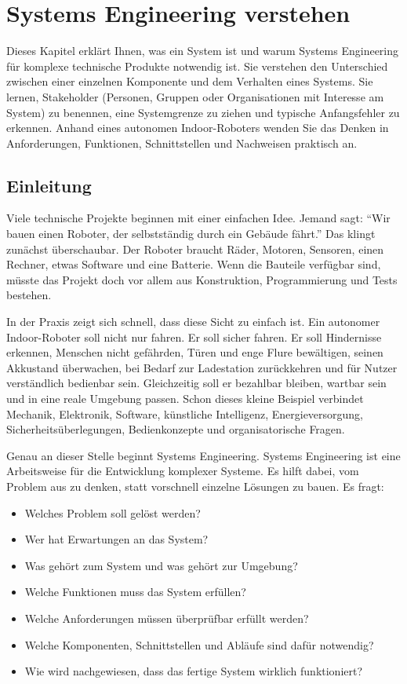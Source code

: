 \chapter{Systems Engineering verstehen}

\begin{lernziele}
Dieses Kapitel erklärt Ihnen, was ein System ist und warum Systems Engineering für komplexe technische Produkte notwendig ist. Sie verstehen den Unterschied zwischen einer einzelnen Komponente und dem Verhalten eines Systems. Sie lernen, Stakeholder (Personen, Gruppen oder Organisationen mit Interesse am System) zu benennen, eine Systemgrenze zu ziehen und typische Anfangsfehler zu erkennen. Anhand eines autonomen Indoor-Roboters wenden Sie das Denken in Anforderungen, Funktionen, Schnittstellen und Nachweisen praktisch an.
\end{lernziele}

\section{Einleitung}
Viele technische Projekte beginnen mit einer einfachen Idee. Jemand sagt: \enquote{Wir bauen einen Roboter, der selbstständig durch ein Gebäude fährt.} Das klingt zunächst überschaubar. Der Roboter braucht Räder, Motoren, Sensoren, einen Rechner, etwas Software und eine Batterie. Wenn die Bauteile verfügbar sind, müsste das Projekt doch vor allem aus Konstruktion, Programmierung und Tests bestehen.

In der Praxis zeigt sich schnell, dass diese Sicht zu einfach ist. Ein autonomer Indoor-Roboter soll nicht nur fahren. Er soll sicher fahren. Er soll Hindernisse erkennen, Menschen nicht gefährden, Türen und enge Flure bewältigen, seinen Akkustand überwachen, bei Bedarf zur Ladestation zurückkehren und für Nutzer verständlich bedienbar sein. Gleichzeitig soll er bezahlbar bleiben, wartbar sein und in eine reale Umgebung passen. Schon dieses kleine Beispiel verbindet Mechanik, Elektronik, Software, künstliche Intelligenz, Energieversorgung, Sicherheitsüberlegungen, Bedienkonzepte und organisatorische Fragen.

Genau an dieser Stelle beginnt Systems Engineering. Systems Engineering ist eine Arbeitsweise für die Entwicklung komplexer Systeme. Es hilft dabei, vom Problem aus zu denken, statt vorschnell einzelne Lösungen zu bauen. Es fragt:

\begin{itemize}
    \item Welches Problem soll gelöst werden?
    \item Wer hat Erwartungen an das System?
    \item Was gehört zum System und was gehört zur Umgebung?
    \item Welche Funktionen muss das System erfüllen?
    \item Welche Anforderungen müssen überprüfbar erfüllt werden?
    \item Welche Komponenten, Schnittstellen und Abläufe sind dafür notwendig?
    \item Wie wird nachgewiesen, dass das fertige System wirklich funktioniert?
\end{itemize}

